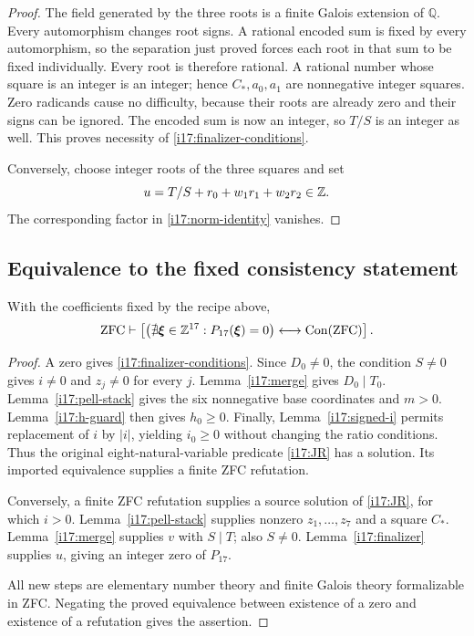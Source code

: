 \begin{proof}
The field generated by the three roots is a finite Galois extension of
$\mathbb Q$. Every automorphism changes root signs. A rational encoded
sum is fixed by every automorphism, so the separation just proved
forces each root in that sum to be fixed individually.
Every root is therefore rational. A rational number whose square is an
integer is an integer; hence $C_\ast,a_0,a_1$ are nonnegative integer
squares. Zero radicands cause no difficulty, because their roots are
already zero and their signs can be ignored.
The encoded sum is now an integer, so $T/S$ is an integer as well.
This proves necessity of \eqref{i17:finalizer-conditions}.

Conversely, choose integer roots of the three squares and set
\[
 u=T/S+r_0+w_1r_1+w_2r_2\in\mathbb Z.
\]
The corresponding factor in \eqref{i17:norm-identity} vanishes.
\end{proof}

\subsection{Equivalence to the fixed consistency statement}

\begin{theorem}
\label{i17:main}
With the coefficients fixed by the recipe above,
\[
 \mathrm{ZFC}\vdash
 \left[
 \left(\nexists\boldsymbol\xi\in\mathbb Z^{17}:P_{17}(\boldsymbol\xi)=0\right)
 \longleftrightarrow\operatorname{Con}(\mathrm{ZFC})
 \right].
\]
\end{theorem}
\begin{proof}
A zero gives \eqref{i17:finalizer-conditions}.
Since $D_0\ne0$, the condition $S\ne0$ gives $i\ne0$ and
$z_j\ne0$ for every $j$.
Lemma~\ref{i17:merge} gives $D_0\mid T_0$.
Lemma~\ref{i17:pell-stack} gives the six nonnegative base coordinates
and $m>0$. Lemma~\ref{i17:h-guard} then gives $h_0\ge0$.
Finally, Lemma~\ref{i17:signed-i} permits replacement of $i$ by $|i|$,
yielding $i_0\ge0$ without changing the ratio conditions.
Thus the original eight-natural-variable predicate
\eqref{i17:JR} has a solution. Its imported equivalence supplies a
finite ZFC refutation.

Conversely, a finite ZFC refutation supplies a source solution of
\eqref{i17:JR}, for which $i>0$.
Lemma~\ref{i17:pell-stack} supplies nonzero $z_1,\ldots,z_7$ and
a square $C_\ast$. Lemma~\ref{i17:merge} supplies $v$ with $S\mid T$;
also $S\ne0$. Lemma~\ref{i17:finalizer} supplies $u$, giving an
integer zero of $P_{17}$.

All new steps are elementary number theory and finite Galois theory
formalizable in ZFC. Negating the proved equivalence between existence
of a zero and existence of a refutation gives the assertion.
\end{proof}

